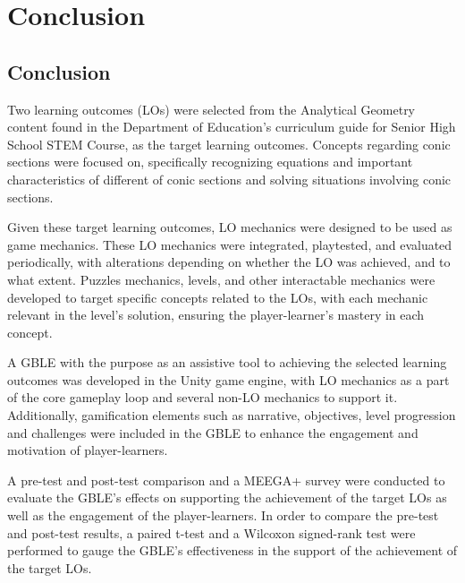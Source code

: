 %
%
%                 

\chapter{Conclusion}
\label{sec:results }

\section{Conclusion}
Two learning outcomes (LOs) were selected from the Analytical Geometry content found in the Department of Education’s curriculum guide for Senior High School STEM Course, as the target learning outcomes. Concepts regarding conic sections were focused on, specifically recognizing equations and important characteristics of different  of conic sections and solving situations involving conic sections.

Given these target learning outcomes, LO mechanics were designed to be used as game mechanics. These LO mechanics were integrated, playtested, and evaluated periodically, with alterations depending on whether the LO was achieved, and to what extent. Puzzles mechanics, levels, and other interactable mechanics were developed to target specific concepts related to the LOs, with each mechanic relevant in the level's solution, ensuring the player-learner's mastery in each concept.

A GBLE with the purpose as an assistive tool to achieving the selected learning outcomes was developed in the Unity game engine, with LO mechanics as a part of the core gameplay loop and several non-LO mechanics to support it. Additionally, gamification elements such as narrative, objectives, level progression and challenges were included in the GBLE to enhance the engagement and motivation of player-learners.

A pre-test and post-test comparison and a MEEGA+ survey were conducted to evaluate the GBLE's effects on supporting the achievement of the target LOs as well as the engagement of the player-learners. In order to compare the pre-test and post-test results, a paired t-test and a Wilcoxon signed-rank test were performed to gauge the GBLE's effectiveness in the support of the achievement of the target LOs.

